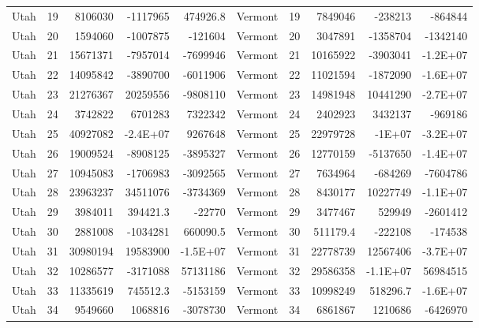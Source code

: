 \begin{table}[]
\begin{tabular}{lrrrrlrrrr}
		Utah &  19 & 8106030 & -1117965 & 474926.8 & Vermont &  19 & 7849046 & -238213 & -864844 \\
		Utah &  20 & 1594060 & -1007875 & -121604 & Vermont &  20 & 3047891 & -1358704 & -1342140 \\
		Utah &  21 & 15671371 & -7957014 & -7699946 & Vermont &  21 & 10165922 & -3903041 & -1.2E+07 \\
		Utah &  22 & 14095842 & -3890700 & -6011906 & Vermont &  22 & 11021594 & -1872090 & -1.6E+07 \\
		Utah &  23 & 21276367 & 20259556 & -9808110 & Vermont &  23 & 14981948 & 10441290 & -2.7E+07 \\
		Utah &  24 & 3742822 & 6701283 & 7322342 & Vermont &  24 & 2402923 & 3432137 & -969186 \\
		Utah &  25 & 40927082 & -2.4E+07 & 9267648 & Vermont &  25 & 22979728 & -1E+07 & -3.2E+07 \\
		Utah &  26 & 19009524 & -8908125 & -3895327 & Vermont &  26 & 12770159 & -5137650 & -1.4E+07 \\
		Utah &  27 & 10945083 & -1706983 & -3092565 & Vermont &  27 & 7634964 & -684269 & -7604786 \\
		Utah &  28 & 23963237 & 34511076 & -3734369 & Vermont &  28 & 8430177 & 10227749 & -1.1E+07 \\
		Utah &  29 & 3984011 & 394421.3 & -22770 & Vermont &  29 & 3477467 & 529949 & -2601412 \\
		Utah &  30 & 2881008 & -1034281 & 660090.5 & Vermont &  30 & 511179.4 & -222108 & -174538 \\
		Utah &  31 & 30980194 & 19583900 & -1.5E+07 & Vermont &  31 & 22778739 & 12567406 & -3.7E+07 \\
		Utah &  32 & 10286577 & -3171088 & 57131186 & Vermont &  32 & 29586358 & -1.1E+07 & 56984515 \\
		Utah &  33 & 11335619 & 745512.3 & -5153159 & Vermont &  33 & 10998249 & 518296.7 & -1.6E+07 \\
		Utah &  34 & 9549660 & 1068816 & -3078730 & Vermont &  34 & 6861867 & 1210686 & -6426970
	\end{tabular}
\end{table}


